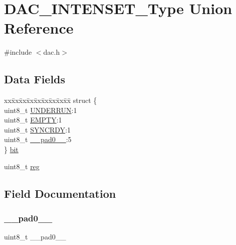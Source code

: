 \hypertarget{union_d_a_c___i_n_t_e_n_s_e_t___type}{}\section{D\+A\+C\+\_\+\+I\+N\+T\+E\+N\+S\+E\+T\+\_\+\+Type Union Reference}
\label{union_d_a_c___i_n_t_e_n_s_e_t___type}


{\ttfamily \#include $<$dac.\+h$>$}

\subsection*{Data Fields}
\begin{DoxyCompactItemize}
\item 
\begin{tabbing}
xx\=xx\=xx\=xx\=xx\=xx\=xx\=xx\=xx\=\kill
struct \{\\
\>uint8\_t \mbox{\hyperlink{union_d_a_c___i_n_t_e_n_s_e_t___type_a4a600e4515233e5fe148ced76d012923}{UNDERRUN}}:1\\
\>uint8\_t \mbox{\hyperlink{union_d_a_c___i_n_t_e_n_s_e_t___type_aef6972f7f1f375b8bfde6f2bef407515}{EMPTY}}:1\\
\>uint8\_t \mbox{\hyperlink{union_d_a_c___i_n_t_e_n_s_e_t___type_aece75e176e4fd55bf68937f1b56bde63}{SYNCRDY}}:1\\
\>uint8\_t \mbox{\hyperlink{union_d_a_c___i_n_t_e_n_s_e_t___type_a8b4eebe79ded0459acec2f4950102ba3}{\_\_pad0\_\_}}:5\\
\} \mbox{\hyperlink{union_d_a_c___i_n_t_e_n_s_e_t___type_ade49c791f20d818dd41f0a77c0098858}{bit}}\\

\end{tabbing}\item 
uint8\+\_\+t \mbox{\hyperlink{union_d_a_c___i_n_t_e_n_s_e_t___type_a9428adc9af4653a2050e2536b55dec8d}{reg}}
\end{DoxyCompactItemize}


\subsection{Field Documentation}
\mbox{\label{union_d_a_c___i_n_t_e_n_s_e_t___type_a8b4eebe79ded0459acec2f4950102ba3}} 
\subsubsection{\texorpdfstring{\_\_pad0\_\_}{\_\_pad0\_\_}}
{\footnotesize\ttfamily uint8\+\_\+t \+\_\+\+\_\+pad0\+\_\+\+\_\+}

